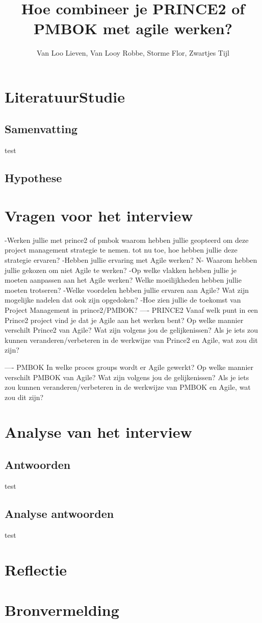 \documentclass[]{article}
\title{Hoe combineer je PRINCE2 of PMBOK met agile werken?}
\author{Van Loo Lieven, Van Looy Robbe, Storme Flor, Zwartjes Tijl}
\begin{document}
\maketitle
\begin{abstract}

\end{abstract}

\tableofcontents


\section{LiteratuurStudie}
\subsection{Samenvatting}
test
\subsection{Hypothese}

\section{Vragen voor het interview}
-Werken jullie met prince2 of pmbok
	waarom hebben jullie geopteerd om deze project management strategie te nemen.
	tot nu toe, hoe hebben jullie deze strategie ervaren?
-Hebben jullie ervaring met Agile werken?
	N- Waarom hebben jullie gekozen om niet Agile te werken?
-Op welke vlakken hebben jullie je moeten aanpassen aan het Agile werken?
	Welke moeilijkheden hebben jullie moeten trotseren?
-Welke voordelen hebben jullie ervaren aan Agile?
	Wat zijn mogelijke nadelen dat ook zijn opgedoken?
-Hoe zien jullie de toekomst van Project Management in prince2/PMBOK?
----
PRINCE2
	Vanaf welk punt in een Prince2 project vind je dat je Agile aan het werken bent?
	Op welke mannier verschilt Prince2 van Agile?
		Wat zijn volgens jou de gelijkenissen?
	Als je iets zou kunnen veranderen/verbeteren in de werkwijze van Prince2 en Agile, wat zou dit zijn?
	
----
PMBOK
	In welke proces groups wordt er Agile gewerkt?
	Op welke mannier verschilt PMBOK van Agile?
	Wat zijn volgens jou de gelijkenissen?
	Als je iets zou kunnen veranderen/verbeteren in de werkwijze van PMBOK en Agile, wat zou dit zijn?

\section{Analyse van het interview}

\subsection{Antwoorden}
test
\subsection{Analyse antwoorden}
test

\section{Reflectie}

\section{Bronvermelding}
\printbibliography
\end{document}
